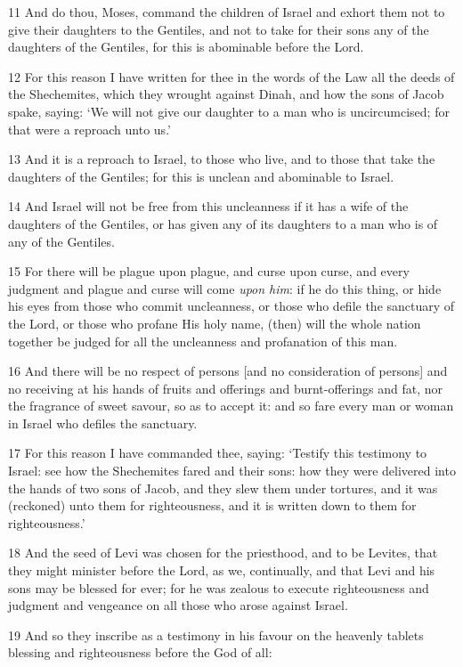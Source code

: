 \par 11 And do thou, Moses, command the children of Israel and exhort them not to give their daughters to the Gentiles, and not to take for their sons any of the daughters of the Gentiles, for this is abominable before the Lord.
\par 12 For this reason I have written for thee in the words of the Law all the deeds of the Shechemites, which they wrought against Dinah, and how the sons of Jacob spake, saying: ‘We will not give our daughter to a man who is uncircumcised; for that were a reproach unto us.’
\par 13 And it is a reproach to Israel, to those who live, and to those that take the daughters of the Gentiles; for this is unclean and abominable to Israel.
\par 14 And Israel will not be free from this uncleanness if it has a wife of the daughters of the Gentiles, or has given any of its daughters to a man who is of any of the Gentiles.
\par 15 For there will be plague upon plague, and curse upon curse, and every judgment and plague and curse will come \textit{upon him}: if he do this thing, or hide his eyes from those who commit uncleanness, or those who defile the sanctuary of the Lord, or those who profane His holy name, (then) will the whole nation together be judged for all the uncleanness and profanation of this man.
\par 16 And there will be no respect of persons [and no consideration of persons] and no receiving at his hands of fruits and offerings and burnt-offerings and fat, nor the fragrance of sweet savour, so as to accept it: and so fare every man or woman in Israel who defiles the sanctuary.
\par 17 For this reason I have commanded thee, saying: ‘Testify this testimony to Israel: see how the Shechemites fared and their sons: how they were delivered into the hands of two sons of Jacob, and they slew them under tortures, and it was (reckoned) unto them for righteousness, and it is written down to them for righteousness.’
\par 18 And the seed of Levi was chosen for the priesthood, and to be Levites, that they might minister before the Lord, as we, continually, and that Levi and his sons may be blessed for ever; for he was zealous to execute righteousness and judgment and vengeance on all those who arose against Israel.
\par 19 And so they inscribe as a testimony in his favour on the heavenly tablets blessing and righteousness before the God of all:
